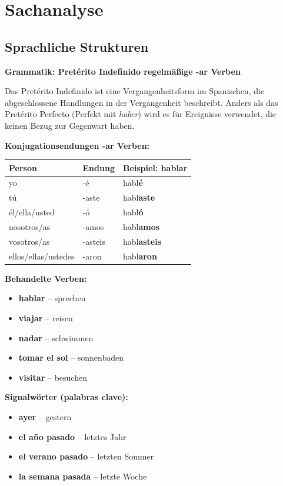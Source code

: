 \documentclass[11pt,a4paper]{article}
\begin{document}
\section{Sachanalyse}

\subsection{Sprachliche Strukturen}

\textbf{Grammatik: Pretérito Indefinido regelmäßige -ar Verben}

Das Pretérito Indefinido ist eine Vergangenheitsform im Spanischen, die abgeschlossene Handlungen in der Vergangenheit beschreibt. Anders als das Pretérito Perfecto (Perfekt mit \textit{haber}) wird es für Ereignisse verwendet, die keinen Bezug zur Gegenwart haben.

\textbf{Konjugationsendungen -ar Verben:}
\begin{center}
\begin{tabular}{|l|l|l|}
\hline
\textbf{Person} & \textbf{Endung} & \textbf{Beispiel: hablar} \\
\hline
yo & -é & habl\textbf{é} \\
tú & -aste & habl\textbf{aste} \\
él/ella/usted & -ó & habl\textbf{ó} \\
nosotros/as & -amos & habl\textbf{amos} \\
vosotros/as & -asteis & habl\textbf{asteis} \\
ellos/ellas/ustedes & -aron & habl\textbf{aron} \\
\hline
\end{tabular}
\end{center}

\textbf{Behandelte Verben:}
\begin{itemize}
    \item \textbf{hablar} -- sprechen
    \item \textbf{viajar} -- reisen
    \item \textbf{nadar} -- schwimmen
    \item \textbf{tomar el sol} -- sonnenbaden
    \item \textbf{visitar} -- besuchen
\end{itemize}

\textbf{Signalwörter (palabras clave):}
\begin{itemize}
    \item \textbf{ayer} -- gestern
    \item \textbf{el año pasado} -- letztes Jahr
    \item \textbf{el verano pasado} -- letzten Sommer
    \item \textbf{la semana pasada} -- letzte Woche
\end{itemize}
\end{document}
